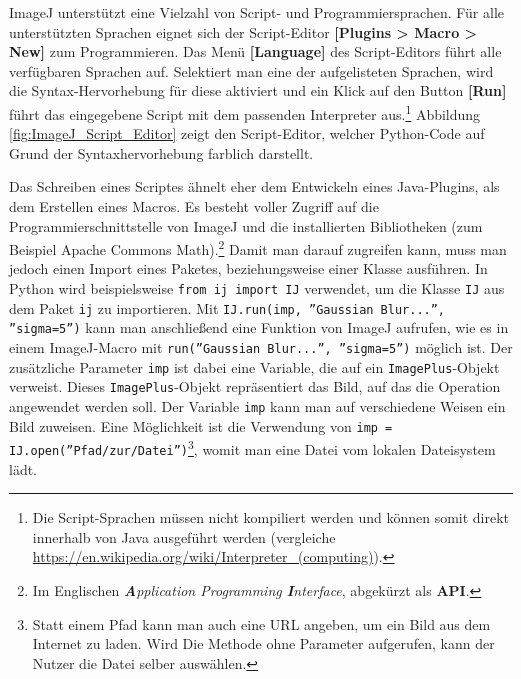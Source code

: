\documentclass[
	paper=a4,				%
	twoside=true,			%
	BCOR=6mm,				%
	fontsize=12pt,			%
	pagesize=auto,			%
	numbers=noenddot,		%
	bibliography=totoc,		%
	draft=false
]{scrartcl}
\begin{document}
ImageJ unterstützt eine Vielzahl von Script- und Programmiersprachen. Für alle unterstützten Sprachen eignet sich der Script-Editor \textbf{[Plugins > Macro > New]} zum Programmieren. Das Menü \textbf{[Language]} des Script-Editors führt alle verfügbaren Sprachen auf. Selektiert man eine der aufgelisteten Sprachen, wird die Syntax-Hervorhebung für diese aktiviert und ein Klick auf den Button \textbf{[Run]} führt das eingegebene Script mit dem passenden Interpreter aus.\footnote{Die Script-Sprachen müssen nicht kompiliert werden und können somit direkt innerhalb von Java ausgeführt werden (vergleiche \url{https://en.wikipedia.org/wiki/Interpreter_(computing)}).}
Abbildung \ref{fig:ImageJ_Script_Editor} zeigt den Script-Editor, welcher Python-Code auf Grund der Syntaxhervorhebung farblich darstellt.

Das Schreiben eines Scriptes ähnelt eher dem Entwickeln eines Java-Plugins, als dem Erstellen eines Macros. Es besteht voller Zugriff auf die Programmierschnittstelle von ImageJ und die installierten Bibliotheken (zum Beispiel Apache Commons Math).\footnote{Im Englischen \textit{\textbf{A}pplication \textbf{}Programming \textbf{I}nterface}, abgekürzt als \textbf{API}.}
Damit man darauf zugreifen kann, muss man jedoch einen Import eines Paketes, beziehungsweise einer Klasse ausführen. In Python wird beispielsweise \texttt{from ij import IJ} verwendet, um die Klasse \texttt{IJ} aus dem Paket \texttt{ij} zu importieren. Mit \texttt{IJ.run(imp, ''Gaussian Blur...'', ''sigma=5'')} kann man anschließend eine Funktion von ImageJ aufrufen, wie es in einem ImageJ-Macro mit \texttt{run(''Gaussian Blur...'', ''sigma=5'')} möglich ist. Der zusätzliche Parameter \texttt{imp} ist dabei eine Variable, die auf ein \texttt{ImagePlus}-Objekt verweist. Dieses \texttt{ImagePlus}-Objekt repräsentiert das Bild, auf das die Operation angewendet werden soll. Der Variable \texttt{imp} kann man auf verschiedene Weisen ein Bild zuweisen. Eine Möglichkeit ist die Verwendung von \texttt{imp = IJ.open(''Pfad/zur/Datei'')}\footnote{Statt einem Pfad kann man auch eine URL angeben, um ein Bild aus dem Internet zu laden. Wird Die Methode ohne Parameter aufgerufen, kann der Nutzer die Datei selber auswählen.}, womit man eine Datei vom lokalen Dateisystem lädt.
\end{document}
